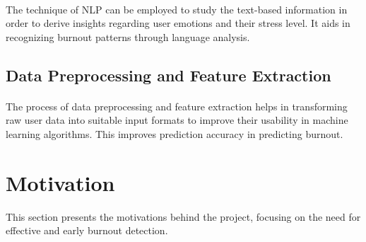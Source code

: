 \begin{itemize}
\paragraph{}
The technique of NLP can be employed to study the text-based information in order to derive insights regarding user emotions and their stress level. It aids in recognizing burnout patterns through language analysis.
\subsection{Data Preprocessing and Feature Extraction}
\paragraph{}
The process of data preprocessing and feature extraction helps in transforming raw user data into suitable input formats to improve their usability in machine learning algorithms. This improves prediction accuracy in predicting burnout.
\end{itemize}

\section{Motivation}

This section presents the motivations behind the project, focusing on the need for effective and early burnout detection.

